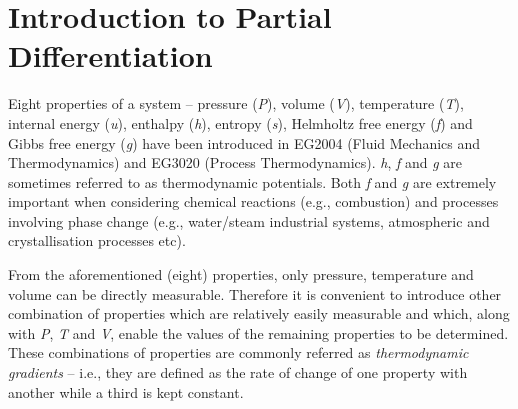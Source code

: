 
\section{Introduction to Partial Differentiation}
Eight properties of a system -- pressure ({\it P}), volume ({\it V}), temperature ({\it T}), internal energy ({\it u}), enthalpy ({\it h}), entropy ({\it s}), Helmholtz free energy ({\it f}) and Gibbs free energy ({\it g}) have been introduced in EG2004 (Fluid Mechanics and Thermodynamics) and EG3020 (Process Thermodynamics). {\it h}, {\it f} and {\it g} are sometimes referred to as thermodynamic potentials. Both {\it f} and {\it g} are extremely important when considering chemical reactions (e.g., combustion) and processes involving phase change (e.g., water/steam industrial systems, atmospheric and crystallisation processes etc).

From the aforementioned (eight) properties, only pressure, temperature and volume can be directly measurable. Therefore it is convenient to introduce other combination of properties which are relatively easily measurable and which, along with {\it P}, {\it T} and {\it V}, enable the values of the remaining properties to be determined. These combinations of properties are commonly referred as {\it thermodynamic gradients} -- i.e., they are defined as the rate of change of one property with another while a third is kept constant.

\medskip

